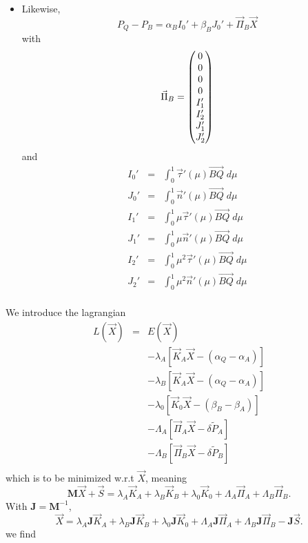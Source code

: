 \documentclass[11pt]{amsart}
\newcommand{\myvec}[1]{\overrightarrow{#1}}
\newcommand{\mymat}[1]{\mathbf{#1}}
\begin{document}
\begin{itemize}
	\item
	Likewise,
	\[
		P_Q - P_B = \alpha_B I_0' + \beta_B J_0' + \vec{\Pi}_B \vec{X}
	\]
	with
	\[
	\vec{\Pi}_B =
		\begin{pmatrix}
			0\cr
			0\cr
			0\cr
			0\cr
			I_1'\cr
			I_2'\cr
			J_1'\cr
			J_2'\cr
		\end{pmatrix}
	\]
	and
	\[
		\begin{array}{rcl}
		I_0' & = & \int_0^1 \vec{\tau}'(\mu)\myvec{BQ}\;d\mu\\
		J_0' & = & \int_0^1 \vec{n}'(\mu)\myvec{BQ}\;d\mu\\
		I_1' & = & \int_0^1 \mu\vec{\tau}'(\mu)\myvec{BQ}\;d\mu\\
		J_1' & = & \int_0^1 \mu\vec{n}'(\mu)\myvec{BQ}\;d\mu\\
		I_2' & = & \int_0^1 \mu^2\vec{\tau}'(\mu)\myvec{BQ}\;d\mu\\
		J_2' & = & \int_0^1 \mu^2\vec{n}'(\mu)\myvec{BQ}\;d\mu\\
		\end{array}
	\]
\end{itemize}
We introduce the lagrangian
\[
	\begin{array}{rcl}
	L(\vec{X}) &=& E(\vec{X}) \\
	           & & - \lambda_A\left[ \vec{K}_A\vec{X}   - (\alpha_Q-\alpha_A)\right]\\
	           & & - \lambda_B\left[ \vec{K}_A\vec{X}   - (\alpha_Q-\alpha_A)\right]\\
	           & & - \lambda_0\left[ \vec{K}_0\vec{X}   - (\beta_B-\beta_A)\right]\\
	           & & - \Lambda_A\left[ \vec{\Pi}_A\vec{X} - \delta\tilde{P}_A\right]\\
	           & & - \Lambda_B\left[ \vec{\Pi}_B\vec{X} - \delta\tilde{P}_B\right]\\
	\end{array}
\]
which is to be minimized w.r.t $\vec{X}$, meaning
\[
	\mymat{M}\vec{X} + \vec{S} = 
	\lambda_A \vec{K}_A +
	\lambda_B \vec{K}_B +
	\lambda_0 \vec{K}_0 +
	\Lambda_A \vec{\Pi}_A +
	\Lambda_B \vec{\Pi}_B.
\]
With $\mymat{J}=\mymat{M}^{-1}$,
\[
	\vec{X} = \lambda_A \mymat{J}\vec{K}_A +
	\lambda_B \mymat{J}\vec{K}_B +
	\lambda_0 \mymat{J}\vec{K}_0 +
	\Lambda_A \mymat{J}\vec{\Pi}_A +
	\Lambda_B \mymat{J}\vec{\Pi}_B 
	- \mymat{J}\vec{S}.
\]
we find
\end{document}
